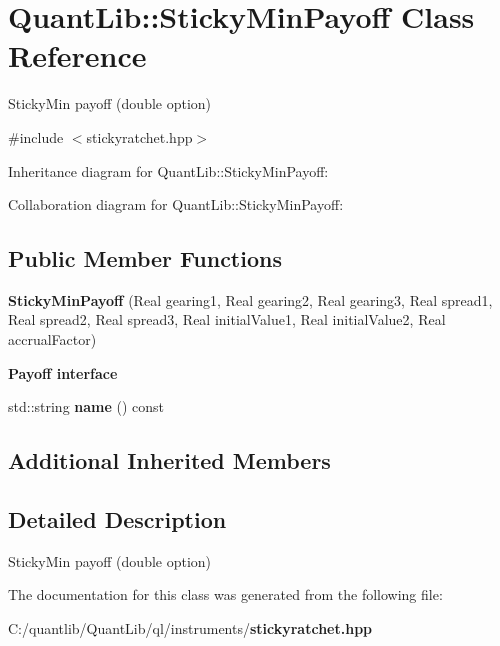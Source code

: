 \section{Quant\+Lib\+:\+:Sticky\+Min\+Payoff Class Reference}
\label{class_quant_lib_1_1_sticky_min_payoff}


Sticky\+Min payoff (double option)  




{\ttfamily \#include $<$stickyratchet.\+hpp$>$}



Inheritance diagram for Quant\+Lib\+:\+:Sticky\+Min\+Payoff\+:


Collaboration diagram for Quant\+Lib\+:\+:Sticky\+Min\+Payoff\+:
\subsection*{Public Member Functions}
\begin{DoxyCompactItemize}
\item 
{\bfseries Sticky\+Min\+Payoff} (Real gearing1, Real gearing2, Real gearing3, Real spread1, Real spread2, Real spread3, Real initial\+Value1, Real initial\+Value2, Real accrual\+Factor)\label{class_quant_lib_1_1_sticky_min_payoff_a906b0e4fb5249cb3a981461b01b1b451}

\end{DoxyCompactItemize}
\begin{Indent}{\bf Payoff interface}\par
\begin{DoxyCompactItemize}
\item 
std\+::string {\bfseries name} () const \label{class_quant_lib_1_1_sticky_min_payoff_a9c92c40da5746ff3d17e071f990421a9}

\end{DoxyCompactItemize}
\end{Indent}
\subsection*{Additional Inherited Members}


\subsection{Detailed Description}
Sticky\+Min payoff (double option) 

The documentation for this class was generated from the following file\+:\begin{DoxyCompactItemize}
\item 
C\+:/quantlib/\+Quant\+Lib/ql/instruments/{\bf stickyratchet.\+hpp}\end{DoxyCompactItemize}
